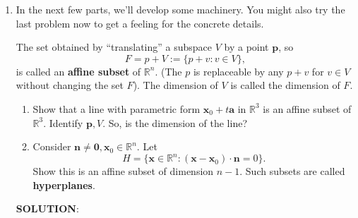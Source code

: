 \documentclass[12pt]{article}
\begin{document}
\begin{enumerate}
\begin{enumerate}
\begin{align*}
                        j & =2 \rightarrow{} \{\mathbf{u}_3, \mathbf{u}_4, \mathbf{u}_5\}               \\
                        j & =3 \rightarrow{} \{\mathbf{u}_3, \mathbf{u}_4, \mathbf{u}_5\}               \\
                        j & =4 \rightarrow{} \{\mathbf{u}_3, \mathbf{u}_4, \mathbf{u}_5\}               \\
                        j & =5 \rightarrow{} \{\mathbf{u}_4, \mathbf{u}_5\}                             \\
                        j & =6 \rightarrow{} \{\mathbf{u}_5 \}                                          \\
                        j & =7 \rightarrow{} \{0\}
                    \end{align*}

          \end{enumerate}
          \vspace{0.5em}

    \item{}
          In the next few parts, we’ll develop some machinery. You might also try the last problem now to get a feeling for the concrete details.

          The set obtained by “translating” a subspace $V$ by a point $\mathbf{p}$, so
          \[
              F = p + V := \{p + v : v \in V\},
          \]
          is called an \textbf{affine subset} of $\mathbb{R}^n$. (The $p$ is replaceable by any $p + v$ for $v \in V$ without changing the set $F$). The dimension of $V$ is called the dimension of $F$.

          \begin{enumerate}
              \item[(a)] Show that a line with parametric form $\mathbf{x}_0 + t\mathbf{a}$ in $\mathbb{R}^3$ is an affine subset of $\mathbb{R}^3$. Identify $\mathbf{p}, V$. So, is the dimension of the line?

              \item[(b)] Consider $\mathbf{n} \neq \mathbf{0}, \mathbf{x}_0 \in \mathbb{R}^n$. Let
                    \[
                        H = \{\mathbf{x} \in \mathbb{R}^n : (\mathbf{x} - \mathbf{x}_0) \cdot \mathbf{n} = 0\}.
                    \]
                    Show this is an affine subset of dimension $n-1$. Such subsets are called \textbf{hyperplanes}.
          \end{enumerate}


          \textbf{SOLUTION}:


\end{enumerate}
\end{document}
